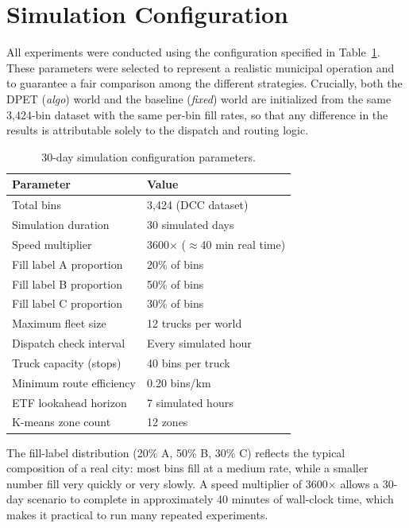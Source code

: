 \section{Simulation Configuration}
\label{sec:sim_config}

\indent All experiments were conducted using the configuration specified in Table~\ref{tab:sim_config}. These parameters were selected to represent a realistic municipal operation and to guarantee a fair comparison among the different strategies. Crucially, both the DPET (\textit{algo}) world and the baseline (\textit{fixed}) world are initialized from the same 3,424-bin dataset with the same per-bin fill rates, so that any difference in the results is attributable solely to the dispatch and routing logic.

\begin{table}[H]
\centering
\caption{30-day simulation configuration parameters.}
\label{tab:sim_config}
\begin{tabular}{ll}
\toprule
\textbf{Parameter} & \textbf{Value} \\
\midrule
Total bins                  & 3,424 (DCC dataset) \\
Simulation duration         & 30 simulated days \\
Speed multiplier            & 3600$\times$ ($\approx$40 min real time) \\
Fill label A proportion     & 20\% of bins \\
Fill label B proportion     & 50\% of bins \\
Fill label C proportion     & 30\% of bins \\
Maximum fleet size          & 12 trucks per world \\
Dispatch check interval     & Every simulated hour \\
Truck capacity (stops)      & 40 bins per truck \\
Minimum route efficiency    & 0.20 bins/km \\
ETF lookahead horizon       & 7 simulated hours \\
K-means zone count          & 12 zones \\
\bottomrule
\end{tabular}
\end{table}

\indent The fill-label distribution (20\% A, 50\% B, 30\% C) reflects the typical composition of a real city: most bins fill at a medium rate, while a smaller number fill very quickly or very slowly. A speed multiplier of 3600$\times$ allows a 30-day scenario to complete in approximately 40 minutes of wall-clock time, which makes it practical to run many repeated experiments.

